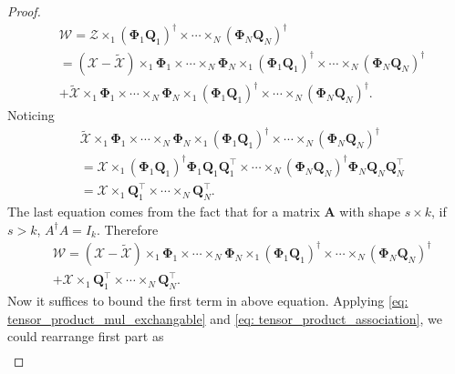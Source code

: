 \begin{lem}
\begin{proof}
\begin{equation}
\begin{aligned}
&\mathscr{W} = \mathscr{Z}\times_1 (\mathbf{\Phi}_1 \mathbf{Q}_1)^\dag \times \cdots \times_N (\mathbf{\Phi}_N \mathbf{Q}_N)^\dag \\
& = (\mathscr{X} -  \tilde{\mathscr{X}})\times_1 \mathbf{\Phi}_1 \times \cdots \times_N \mathbf{\Phi}_N  \times_1 (\mathbf{\Phi}_1 \mathbf{Q}_1)^\dag \times \cdots \times_N (\mathbf{\Phi}_N \mathbf{Q}_N)^\dag 
\\
&+ \tilde{\mathscr{X}}\times_1 \mathbf{\Phi}_1 \times \cdots \times_N \mathbf{\Phi}_N \times_1 (\mathbf{\Phi}_1 \mathbf{Q}_1)^\dag \times \cdots \times_N (\mathbf{\Phi}_N \mathbf{Q}_N)^\dag.
\end{aligned}
\end{equation}
Noticing 
\begin{equation}
\begin{aligned}
&\tilde{\mathscr{X}}\times_1 \mathbf{\Phi}_1 \times \cdots \times_N \mathbf{\Phi}_N \times_1 (\mathbf{\Phi}_1 \mathbf{Q}_1)^\dag \times \cdots \times_N (\mathbf{\Phi}_N \mathbf{Q}_N)^\dag   \\
& = \mathscr{X}\times_1 (\mathbf{\Phi}_1 \mathbf{Q}_1)^\dag \mathbf{\Phi}_1\mathbf{Q}_1\mathbf{Q}_1^\top \times \cdots \times_N (\mathbf{\Phi}_N \mathbf{Q}_N)^\dag \mathbf{\Phi}_N\mathbf{Q}_N\mathbf{Q}_N^\top\\
& = \mathscr{X}\times_1 \mathbf{Q}_1^\top \times \cdots \times_N \mathbf{Q}_N^\top.
\end{aligned}
\end{equation}
The last equation comes from the fact that for a matrix $\mathbf{A}$ with shape $s\times k$, if $s>k$, $A^\dag A = I_k$. Therefore
\begin{equation}
\begin{aligned}
&\mathscr{W} = (\mathscr{X} -  \tilde{\mathscr{X}})\times_1 \mathbf{\Phi}_1 \times \cdots \times_N \mathbf{\Phi}_N  \times_1 (\mathbf{\Phi}_1 \mathbf{Q}_1)^\dag \times \cdots \times_N (\mathbf{\Phi}_N \mathbf{Q}_N)^\dag \\
&+ \mathscr{X}\times_1 \mathbf{Q}_1^\top \times \cdots \times_N \mathbf{Q}_N^\top.
\end{aligned}
\end{equation}
Now it suffices to bound the first term in above equation. Applying \eqref{eq: tensor_product_mul_exchangable} and \eqref{eq: tensor_product_association}, we could rearrange first part as
\begin{equation}
\begin{aligned}

\end{aligned}
\end{equation}
\end{proof}
\end{lem}
